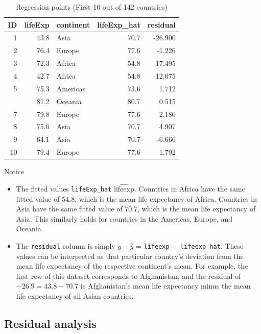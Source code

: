\documentclass[12pt,]{krantz}
\providecommand{\tightlist}{%
  \setlength{\itemsep}{0pt}\setlength{\parskip}{0pt}}
\theoremstyle{definition}
\theoremstyle{definition}
\theoremstyle{definition}
\theoremstyle{remark}
\begin{document}
\begin{table}[H]

\caption{\label{tab:unnamed-chunk-201}Regression points (First 10 out of 142 countries)}
\centering
\fontsize{10}{12}\selectfont
\begin{tabular}[t]{rrlrr}
\toprule
ID & lifeExp & continent & lifeExp\_hat & residual\\
\midrule
1 & 43.8 & Asia & 70.7 & -26.900\\
2 & 76.4 & Europe & 77.6 & -1.226\\
3 & 72.3 & Africa & 54.8 & 17.495\\
4 & 42.7 & Africa & 54.8 & -12.075\\
5 & 75.3 & Americas & 73.6 & 1.712\\
\addlinespace
6 & 81.2 & Oceania & 80.7 & 0.515\\
7 & 79.8 & Europe & 77.6 & 2.180\\
8 & 75.6 & Asia & 70.7 & 4.907\\
9 & 64.1 & Asia & 70.7 & -6.666\\
10 & 79.4 & Europe & 77.6 & 1.792\\
\bottomrule
\end{tabular}
\end{table}

Notice

\begin{itemize}
\tightlist
\item
  The fitted values \texttt{lifeExp\_hat} \(\widehat{\text{lifeexp}}\).
  Countries in Africa have the same fitted value of 54.8, which is the
  mean life expectancy of Africa. Countries in Asia have the same fitted
  value of 70.7, which is the mean life expectancy of Asia. This
  similarly holds for countries in the Americas, Europe, and Oceania.
\item
  The \texttt{residual} column is simply \(y - \widehat{y}\) =
  \texttt{lifeexp\ -\ lifeexp\_hat}. These values can be interpreted as
  that particular country's deviation from the mean life expectancy of
  the respective continent's mean. For example, the first row of this
  dataset corresponds to Afghanistan, and the residual of
  \(-26.9 = 43.8 - 70.7\) is Afghanistan's mean life expectancy minus
  the mean life expectancy of all Asian countries.
\end{itemize}

\subsection{Residual analysis}\label{model2residuals}
\end{document}
